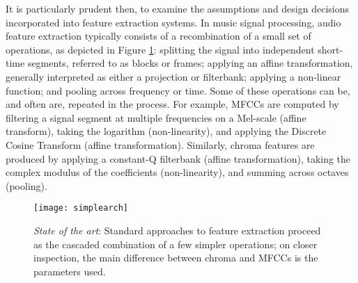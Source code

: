 It is particularly prudent then, to examine the assumptions and design decisions incorporated into feature extraction systems.
In music signal processing, audio feature extraction typically consists of a recombination of a small set of operations, as depicted in Figure \ref{fig:simplearch}: splitting the signal into independent short-time segments, referred to as blocks or frames; applying an affine transformation, generally interpreted as either a projection or filterbank; applying a non-linear function; and pooling across frequency or time.
Some of these operations can be, and often are, repeated in the process.
For example, MFCCs are computed by filtering a signal segment at multiple frequencies on a Mel-scale (affine transform), taking the logarithm (non-linearity), and applying the Discrete Cosine Transform (affine transformation).
Similarly, chroma features are produced by applying a constant-Q filterbank (affine transformation), taking the complex modulus of the coefficients (non-linearity), and summing across octaves (pooling).

\begin{figure}
\begin{centering}
\texttt{[image: simplearch]}
\caption{\emph{State of the art}: Standard approaches to feature extraction proceed as the cascaded combination of a few simpler operations; on closer inspection, the main difference between chroma and MFCCs is the parameters used.}
\label{fig:simplearch}
\end{centering}
\end{figure}


